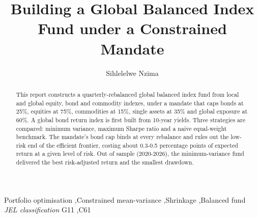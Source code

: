 \documentclass[11pt,preprint]{elsarticle}
\numberwithin{equation}{section}
\numberwithin{figure}{section}
\numberwithin{table}{section}
\begin{document}
\begin{frontmatter}  %

\title{Building a Global Balanced Index Fund under a Constrained
Mandate}





\author[Add1]{Sihlelelwe Nzima}
\ead{}





\address[Add1]{Stellenbosch University, Stellenbosch, South Africa}


\begin{abstract}
\small{
This report constructs a quarterly-rebalanced global balanced index fund
from local and global equity, bond and commodity indexes, under a
mandate that caps bonds at 25\%, equities at 75\%, commodities at 15\%,
single assets at 35\% and global exposure at 60\%. A global bond return
index is first built from 10-year yields. Three strategies are compared:
minimum variance, maximum Sharpe ratio and a naive equal-weight
benchmark. The mandate's bond cap binds at every rebalance and rules out
the low-risk end of the efficient frontier, costing about 0.3-0.5
percentage points of expected return at a given level of risk. Out of
sample (2020-2026), the minimum-variance fund delivered the best
risk-adjusted return and the smallest drawdown.
}
\end{abstract}

\vspace{1cm}


\begin{keyword}
\footnotesize{
Portfolio optimisation \sep Constrained mean-variance \sep Shrinkage
\sep Balanced fund \\
\vspace{0.3cm}
}
\footnotesize{
\textit{JEL classification} G11 \sep C61
}
\end{keyword}



\vspace{0.5cm}

\end{frontmatter}

\setcounter{footnote}{0}



\pagestyle{fancy}
\chead{}
\rhead{}
\lfoot{}
\lhead{}
\cfoot{}
\end{document}
